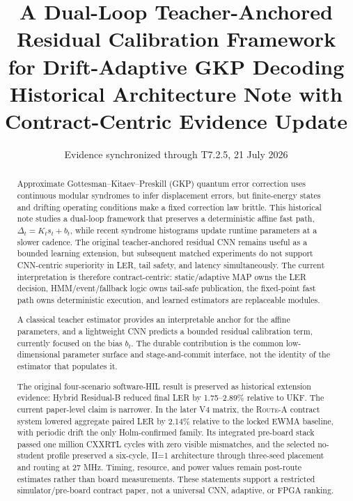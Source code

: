 \documentclass[11pt]{article}
\title{A Dual-Loop Teacher-Anchored Residual Calibration Framework for Drift-Adaptive GKP Decoding\\
\large Historical Architecture Note with Contract-Centric Evidence Update}
\author{}
\date{Evidence synchronized through T7.2.5, 21 July 2026}
\newcommand{\RouteA}{\textsc{Route-A}}
\begin{document}
\maketitle

\begin{abstract}
Approximate Gottesman--Kitaev--Preskill (GKP) quantum error correction uses
continuous modular syndromes to infer displacement errors, but finite-energy
states and drifting operating conditions make a fixed correction law brittle.
This historical note studies a dual-loop framework that preserves a
deterministic affine fast path, \(\Delta_t=K_t s_t+b_t\), while recent syndrome
histograms update runtime parameters at a slower cadence.  The original
teacher-anchored residual CNN remains useful as a bounded learning extension,
but subsequent matched experiments do not support CNN-centric superiority in
LER, tail safety, and latency simultaneously.  The current interpretation is
therefore contract-centric: static/adaptive MAP owns the LER decision,
HMM/event/fallback logic owns tail-safe publication, the fixed-point fast path
owns deterministic execution, and learned estimators are replaceable modules.

A classical teacher estimator provides an interpretable anchor for the affine
parameters, and a lightweight CNN predicts a bounded residual calibration term,
currently focused on the bias \(b_t\).  The durable contribution is the common
low-dimensional parameter surface and stage-and-commit interface, not the
identity of the estimator that populates it.

The original four-scenario software-HIL result is preserved as historical
extension evidence: Hybrid Residual-B reduced final LER by 1.75--2.89\%
relative to UKF.  The current paper-level claim is narrower.  In the later V4
matrix, the \RouteA{} contract system lowered aggregate paired LER by 2.14\%
relative to the locked EWMA baseline, with periodic drift the only
Holm-confirmed family.  Its integrated pre-board stack passed one million
CXXRTL cycles with zero visible mismatches, and the selected no-student profile
preserved a six-cycle, II=1 architecture through three-seed placement and
routing at 27 MHz.  Timing, resource, and power values remain post-route
estimates rather than board measurements.  These statements support a
restricted simulator/pre-board contract paper, not a universal CNN, adaptive,
or FPGA ranking.
\end{abstract}

\tableofcontents
\end{document}
